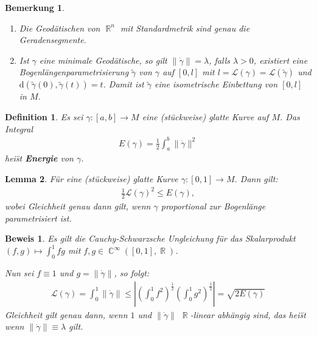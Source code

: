 \documentclass[paper=A4, twoside, chapterprefix=true, bibliography=totoc, headsepline]{scrbook}
\DeclareMathOperator{\C}{\mathbb{C}}
\DeclareMathOperator{\R}{\mathbb{R}}
\newcommand{\dop}{\mathrm{d}}
\theoremstyle{plain}
\newtheorem{Dfn}{Definition}[chapter]
\newtheorem{Lemma}[Dfn]{Lemma}
\theoremstyle{nonumberplain}
\newtheorem{bem}{Bemerkung}
\newtheorem{bew}{Beweis}
\theoremstyle{empty}
\theoremstyle{break}
\newcommand{\CmIndex}[2][]{\ifthenelse{\isempty{#1}}{\index{#2}}{\index{#1}}#2}
\newcommand{\CmMark}[2][]{\textbf{\CmIndex[#1]{#2}}}
\begin{document}

\begin{bem}
  \begin{enumerate}[label=(\arabic*),leftmargin=*]
  \item Die Geod\"atischen von $\R^n$ mit Standardmetrik sind genau die Geradensegmente.
  \item Ist $\gamma$ eine minimale Geod\"atische, so gilt $\|\dot\gamma\| = \lambda$, falls $\lambda > 0$, existiert eine Bogenl\"angenparametrisierung $\tilde\gamma$ von $\gamma$ auf $[0,l]$ mit $l = \mathcal L(\gamma) = \mathcal L(\tilde\gamma)$ und $\dop(\tilde\gamma(0),\tilde\gamma(t)) = t$.
    Damit ist $\tilde\gamma$ eine isometrische Einbettung von $[0,l]$ in $M$.
  \end{enumerate}
\end{bem}

\begin{Dfn}
  Es sei $\gamma \colon [a,b] \to M$ eine (st\"uckweise) glatte Kurve auf $M$.
  Das Integral
  \begin{align*}
    E(\gamma) = \frac{1}2 \int_a^b\|\dot\gamma\|^2
  \end{align*}
  hei\"st \CmMark{Energie} von $\gamma$.
\end{Dfn}

\begin{Lemma}\label{lemma-6-9}
  F\"ur eine (st\"uckweise) glatte Kurve $\gamma \colon [0,1] \to M$.
  Dann gilt:
  \begin{align*}
    \frac{1}2 \mathcal L(\gamma)^2 \leq E(\gamma),
  \end{align*}
  wobei Gleichheit genau dann gilt, wenn $\gamma$ proportional zur Bogenl\"ange parametrisiert ist.
\end{Lemma}

\begin{bew}
  Es gilt die Cauchy-Schwarzsche Ungleichung f\"ur das Skalarprodukt $(f,g) \mapsto \int_0^1 fg$ mit $f,g \in \C^{\infty}([0,1], \R)$.

  Nun sei $f \equiv 1$ und $g = \|\dot\gamma\|$, so folgt:
  \begin{align*}
    \mathcal L(\gamma) = \int_0^1 \|\dot\gamma\| \leq \left|\left(\int_0^1 f^2\right)^{\frac{1}2} \left(\int_0^1g^2\right)^{\frac{1}2}\right| = \sqrt{2 E(\gamma)}
  \end{align*}
  Gleichheit gilt genau dann, wenn $1$ und $\|\dot\gamma\|$ $\R$-linear abh\"angig sind, das hei\"st wenn $\|\dot\gamma\| \equiv \lambda$ gilt.
\end{bew}
\end{document}

